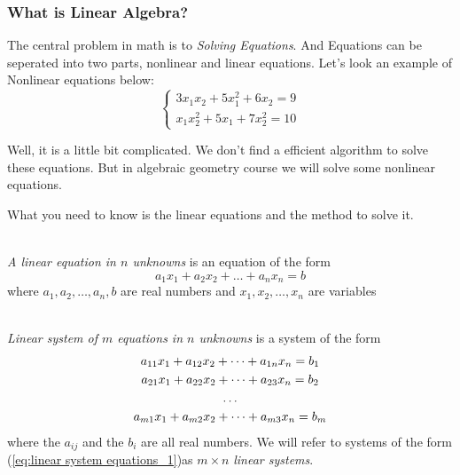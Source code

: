 \subsubsection{What is Linear Algebra?}
The central problem in math is to \emph{Solving Equations}. And Equations can be seperated into two parts, nonlinear and linear equations.
Let's look an example of Nonlinear equations below:
\[ \left\{ \begin{gathered}
3x_1x_2 + 5x_1^2 + 6x_2 = 9 \\
x_1x_2^2 + 5x_1 + 7x_2^2 = 10
\end{gathered}
\right.
\]

Well, it is a little bit complicated. We don't find a efficient algorithm to solve these equations. But in algebraic geometry course we will solve some nonlinear equations.

What you need to know is the linear equations and the method to solve it.

\begin{definition}
\qquad \\
\emph{A linear equation in $n$ unknowns} is an equation of the form
\[a_1x_1 + a_2x_2 +\dots + a_nx_n = b \]
where $a_1,a_2,\dots,a_n,b$ are real numbers and $x_1,x_2,\dots,x_n$ are variables

\end{definition}

\begin{definition}
\qquad \\
\emph{Linear system of $m$ equations in $n$ unknowns} is a system of the form
\begin{gather}
a_{11}x_1 + a_{12}x_2 + \dots + a_{1n}x_n = b_1 \notag \\ 
a_{21}x_1 + a_{22}x_2 + \dots + a_{23}x_n = b_2 \notag \\
\dots 	\notag 	\\
a_{m1}x_1 + a_{m2}x_2 + \dots + a_{m3}x_n = b_m  \label{eq:linear system equations_1}
\end{gather}
where the $a_{ij}$ and the $b_i$ are all real numbers. 
We will refer to systems of the form (\ref{eq:linear system equations_1})as $m \times n$ \emph{linear systems}.

\end{definition}

 

